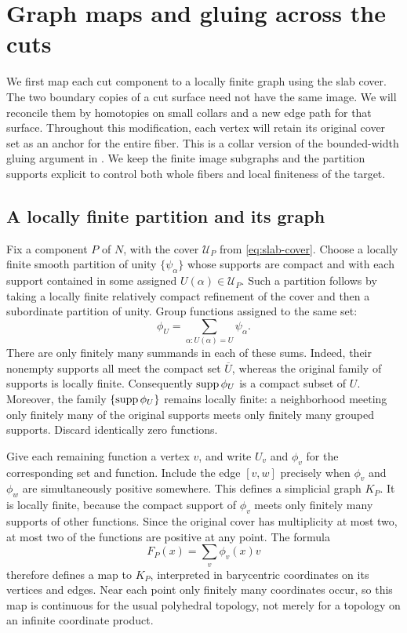 \section{Graph maps and gluing across the cuts}
\label{sec:graph-gluing}

We first map each cut component to a locally finite graph using the
slab cover.  The two boundary copies of a cut surface need not have
the same image.  We will reconcile them by homotopies on small
collars and a new edge path for that surface.  Throughout this modification,
each vertex will retain its original cover set as an anchor for
the entire fiber.
This is a collar version of the bounded-width gluing argument in
\cite[Section~3.10.1, Lemma~(A)]{GromovFourLectures2023}.  We keep the
finite image subgraphs and the partition supports explicit to control
both whole fibers and local finiteness of the target.

\subsection{A locally finite partition and its graph}

Fix a component $P$ of $N$, with the cover $\mathcal U_P$ from
\eqref{eq:slab-cover}.  Choose a locally finite smooth partition of
unity $\{\psi_\alpha\}$ whose supports are compact and with each
support contained in some assigned $U(\alpha)\in\mathcal U_P$.
Such a partition follows by taking a locally finite relatively
compact refinement of the cover and then a subordinate partition
of unity.  Group functions assigned to the same set:
\begin{equation}
\label{eq:grouped-partition}
 \phi_U=\sum_{\alpha:U(\alpha)=U}\psi_\alpha.
\end{equation}
There are only finitely many summands in each of these sums.  Indeed,
their nonempty supports all meet the compact set $\overline U$,
whereas the original family of supports is locally finite.
Consequently $\operatorname{supp}\phi_U$ is a compact subset of $U$.  Moreover,
the family $\{\operatorname{supp}\phi_U\}$ remains locally finite: a neighborhood
meeting only finitely many of the original supports meets only
finitely many grouped supports.  Discard identically zero functions.

Give each remaining function a vertex $v$, and write $U_v$ and
$\phi_v$ for the corresponding set and function.  Include the edge
$[v,w]$ precisely when $\phi_v$ and $\phi_w$ are simultaneously
positive somewhere.  This defines a simplicial graph $K_P$.  It is
locally finite, because the compact support of $\phi_v$ meets only
finitely many supports of other functions.  Since the original
cover has multiplicity at most two, at most two of the functions
are positive at any point.  The formula
\begin{equation}
\label{eq:initial-graph-map}
 F_P(x)=\sum_v\phi_v(x)v
\end{equation}
therefore defines a map to $K_P$, interpreted in barycentric
coordinates on its vertices and edges.  Near each point only
finitely many coordinates occur, so this map is continuous for
the usual polyhedral topology, not merely for a topology on an
infinite coordinate product.

